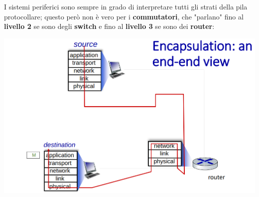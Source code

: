 \documentclass[12pt]{article}
\begin{document}
I sistemi periferici sono sempre in grado di interpretare tutti gli strati della pila protocollare; questo però non è vero per i \textbf{commutatori}, che "parlano" fino al \textbf{livello 2} se sono
degli \textbf{switch} e fino al \textbf{livello 3} se sono dei \textbf{router}:
\begin{center}
    \includegraphics[width = 0.80\linewidth]{Images/31.png}
\end{center}
\end{document}
